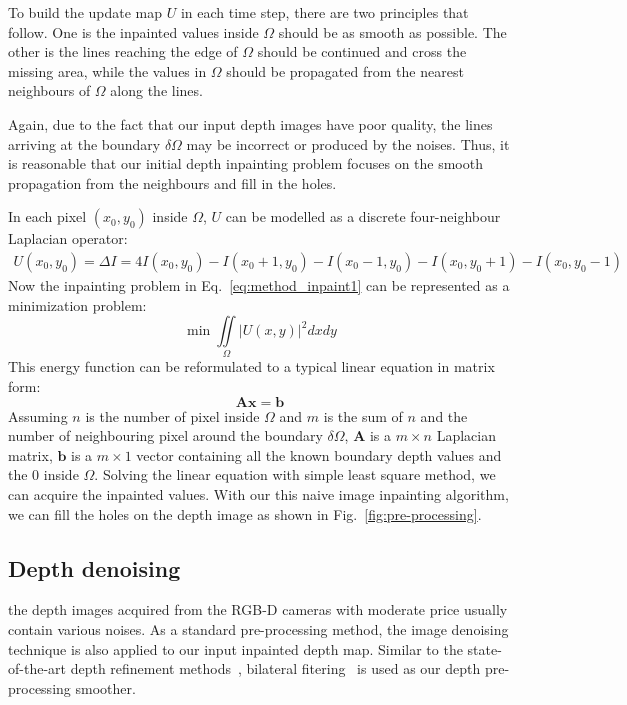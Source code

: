 To build the update map $U$ in each time step, there are two principles that~\cite{bertalmio2000image} follow.
One is the inpainted values inside $\Omega$ should be as smooth as possible. 
The other is the lines reaching the edge of $\Omega$ should be continued and cross the missing area, while the values in $\Omega$ should be propagated from the nearest neighbours of $\Omega$ along the lines.

Again, due to the fact that our input depth images have poor quality, the lines arriving at the boundary $\delta \Omega$ may be incorrect or produced by the noises.
Thus, it is reasonable that our initial depth inpainting problem focuses on the smooth propagation from the neighbours and fill in the holes.

In each pixel $(x_0, y_0)$ inside $\Omega$, $U$ can be modelled as a discrete four-neighbour Laplacian operator:
\begin{equation}
\begin{split}
U(x_0, y_0) = \Delta I
                = 4I(x_0, y_0) - I(x_0 + 1, y_0) - I(x_0 - 1, y_0) - I(x_0, y_0+1) - I(x_0 , y_0 -1)
\end{split}
\end{equation}
Now the inpainting problem in Eq.~\ref{eq:method_inpaint1} can be represented as a minimization problem: 
\begin{equation}
\min \iint\limits_{\Omega} |U(x,y)|^2 dxdy 
\end{equation}
This energy function can be reformulated to a typical linear equation in matrix form:
\begin{equation}
\mathbf{Ax=b}
\end{equation}
Assuming $n$ is the number of pixel inside $\Omega$ and $m$ is the sum of $n$ and the number of neighbouring pixel around the boundary $\delta \Omega$, $\mathbf{A}$ is a $m\times n$ Laplacian matrix, $\mathbf{b}$ is a $m\times1$ vector containing all the known boundary depth values and the $0$ inside $\Omega$.
Solving the linear equation with simple least square method, we can acquire the inpainted values.
With our this naive image inpainting algorithm, we can fill the holes on the depth image as shown in Fig.~\ref{fig:pre-processing}.

\subsection{Depth denoising}
the depth images acquired from the RGB-D cameras with moderate price usually contain various noises. 
As a standard pre-processing method, the image denoising technique is also applied to our input inpainted depth map.
Similar to the state-of-the-art depth refinement methods~\cite{zhang2012edge, or2015rgbd, han2013high, or2016real, haque2014high, yu2013shading}, bilateral fitering~\cite{tomasi1998bilateral} is used as our depth pre-processing smoother. 

